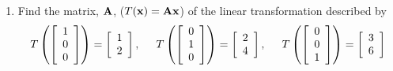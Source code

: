 \documentclass[11pt,titlepage,fleqn]{article}
\begin{document}
\begin{enumerate}
\begin{enumerate}
\item Find the matrix, $\mbox{${\bf A}$}$, ($T(\mbox{${\bf x}$}) = \mbox{${\bf A}$}\mbox{${\bf x}$}$) of the linear transformation described by
%
\begin{equation*}
T \left( \left[ \begin{array}{r} 1 \\ 0 \\ 0  \end{array} \right] \right) = \left[ \begin{array}{r} 1 \\ 2 \end{array} \right],
\hspace{0.5cm}
T \left( \left[ \begin{array}{r} 0 \\ 1 \\ 0  \end{array} \right] \right) = \left[ \begin{array}{r} 2 \\ 4 \end{array} \right],
\hspace{0.5cm}
T \left( \left[ \begin{array}{r} 0 \\ 0 \\ 1  \end{array} \right] \right) = \left[ \begin{array}{r} 3 \\ 6 \end{array} \right]
\end{equation*}


\end{enumerate}
\end{enumerate}
\end{document}
